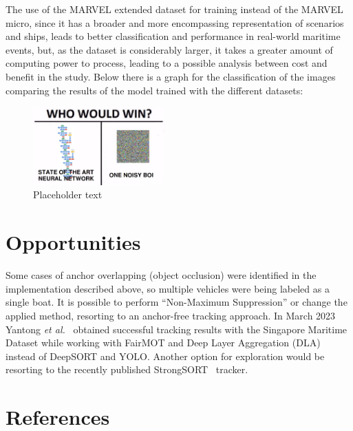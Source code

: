 \documentclass[a4paper,12pt]{article}
\begin{document}
\begin{multicols}{2}

The use of the MARVEL extended dataset for training instead of the MARVEL micro, since it has a broader and more encompassing representation of scenarios and ships, leads to better classification and performance in real-world maritime events, but, as the dataset is considerably larger, it takes a greater amount of computing power to process, leading to a possible analysis between cost and benefit in the study. Below there is a graph for the classification of the images comparing the results of the model trained with the different datasets:

\begin{figure}[H]
    \centering
    \includegraphics[width=0.45\textwidth]{placeholder}
    \caption{Placeholder text}
    \label{fig:3}
\end{figure}

\section{Opportunities}\label{sec:opportunities}
Some cases of anchor overlapping (object occlusion) were identified in the implementation described above, so multiple vehicles were being labeled as a single boat.
It is possible to perform ``Non-Maximum Suppression'' or change the applied method, resorting to an anchor-free tracking approach.
In March 2023 Yantong \textit{et al.}~\cite{FAIRMOT} obtained successful tracking results with the Singapore Maritime Dataset while working with FairMOT and Deep Layer Aggregation (DLA) instead of DeepSORT and YOLO\@.
Another option for exploration would be resorting to the recently published StrongSORT~\cite{STRONGSORT} tracker.

\section{References}\label{sec:references}
\printbibliography[heading=none]
\end{multicols}
\end{document}
